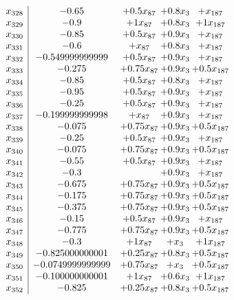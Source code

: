 \documentclass[11pt]{article}
\begin{document}
\[\begin{array}{c| c c@{\hskip 2pt} c@{\hskip 2pt} c@{\hskip 2pt} }
 x_{328}   &  -0.65 & + 0.5 x_{87} & + 0.8 x_{3} & +  x_{187}\\
 x_{329}   &  -0.9 & + 1 x_{87} & + 0.8 x_{3} & + 1 x_{187}\\
 x_{330}   &  -0.85 & + 0.5 x_{87} & + 0.9 x_{3} & +  x_{187}\\
 x_{331}   &  -0.6 & +  x_{87} & + 0.8 x_{3} & +  x_{187}\\
 x_{332}   &  -0.549999999999 & + 0.5 x_{87} & + 0.9 x_{3} & +  x_{187}\\
 x_{333}   &  -0.275 & + 0.75 x_{87} & + 0.9 x_{3} & + 0.5 x_{187}\\
 x_{334}   &  -0.85 & + 0.5 x_{87} & + 0.8 x_{3} & +  x_{187}\\
 x_{335}   &  -0.95 & + 0.5 x_{87} & + 0.9 x_{3} & +  x_{187}\\
 x_{336}   &  -0.25 & + 0.5 x_{87} & + 0.9 x_{3} & +  x_{187}\\
 x_{337}   &  -0.199999999998 & +  x_{87} & + 0.9 x_{3} & +  x_{187}\\
 x_{338}   &  -0.075 & + 0.75 x_{87} & + 0.9 x_{3} & + 0.5 x_{187}\\
 x_{339}   &  -0.25 & + 0.5 x_{87} & + 0.9 x_{3} & +  x_{187}\\
 x_{340}   &  -0.075 & + 0.75 x_{87} & + 0.9 x_{3} & + 0.5 x_{187}\\
 x_{341}   &  -0.55 & + 0.5 x_{87} & + 0.9 x_{3} & +  x_{187}\\
 x_{342}   &  -0.3  &   & + 0.9 x_{3} & +  x_{187}\\
 x_{343}   &  -0.675 & + 0.75 x_{87} & + 0.9 x_{3} & + 0.5 x_{187}\\
 x_{344}   &  -0.175 & + 0.75 x_{87} & + 0.9 x_{3} & + 0.5 x_{187}\\
 x_{345}   &  -0.375 & + 0.75 x_{87} & + 0.9 x_{3} & + 0.5 x_{187}\\
 x_{346}   &  -0.15 & + 0.5 x_{87} & + 0.9 x_{3} & +  x_{187}\\
 x_{347}   &  -0.775 & + 0.75 x_{87} & + 0.9 x_{3} & + 0.5 x_{187}\\
 x_{348}   &  -0.3 & + 1 x_{87} & +  x_{3} & + 1 x_{187}\\
 x_{349}   &  -0.825000000001 & + 0.25 x_{87} & + 0.8 x_{3} & + 0.5 x_{187}\\
 x_{350}   &  -0.0749999999999 & + 0.75 x_{87} & +  x_{3} & + 0.5 x_{187}\\
 x_{351}   &  -0.100000000001 & + 1 x_{87} & + 0.6 x_{3} & + 1 x_{187}\\
 x_{352}   &  -0.825 & + 0.25 x_{87} & + 0.8 x_{3} & + 0.5 x_{187}\\

\end{array}\]
\end{document}
